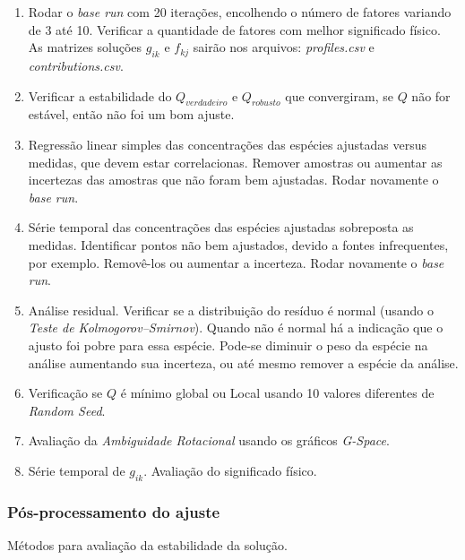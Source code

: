 \begin{enumerate}
  \item Rodar o \textit{base run} com 20 iterações, encolhendo o número de 
        fatores variando de 3 até 10. 
        Verificar a quantidade de fatores com melhor significado físico. 
        As matrizes soluções $g_{ik}$ e $f_{kj}$ sairão nos arquivos: 
        \textit{profiles.csv} e \textit{contributions.csv}.
  \item Verificar a estabilidade do $Q_{verdadeiro}$ e $Q_{robusto}$ que 
        convergiram, se $Q$ não for estável, então não foi um bom ajuste.
  \item Regressão linear simples das concentrações das espécies ajustadas 
        versus medidas, que devem estar correlacionas. 
        Remover amostras ou aumentar as incertezas das amostras que não foram 
        bem ajustadas. Rodar novamente o \textit{base run}.  
  \item Série temporal das concentrações das espécies ajustadas sobreposta
        as medidas. 
        Identificar pontos não bem ajustados, devido a fontes infrequentes, 
        por exemplo.
        Removê-los ou aumentar a incerteza. Rodar novamente o \textit{base run}.
  \item Análise residual. Verificar se a distribuição do resíduo é normal 
        (usando o \textit{Teste de Kolmogorov–Smirnov}). 
        Quando não é normal há a indicação que o ajusto foi pobre para essa 
        espécie. 
        Pode-se diminuir o peso da espécie na análise aumentando sua incerteza, 
        ou até mesmo remover a espécie da análise.
  \item Verificação se $Q$ é mínimo global ou Local usando 10 valores 
        diferentes de \textit{Random Seed}.
  \item Avaliação da \textit{Ambiguidade Rotacional} usando os 
        gráficos \textit{G-Space}.
  \item Série temporal de $g_{ik}$. Avaliação do significado físico.
\end{enumerate}

\subsubsection{Pós-processamento do ajuste}
Métodos para avaliação da estabilidade da solução.

 
